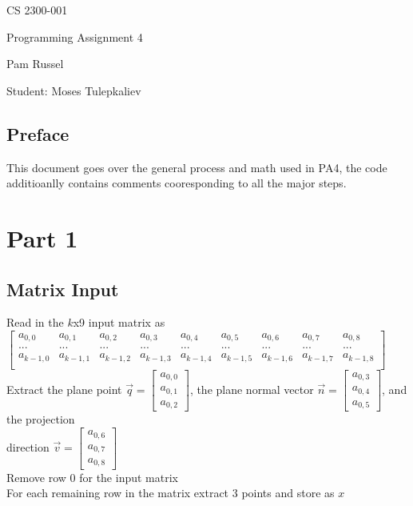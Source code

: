 \documentclass[11pt]{article}
\begin{document}
 

\rhead{\today}

\begin{center}\begin{Large}
CS 2300-001

Programming Assignment 4

Pam Russel

Student: Moses Tulepkaliev
\end{Large}
\end{center}

\subsection*{Preface}
This document goes over the general process and math used in PA4, the code additioanlly contains comments cooresponding to all the major steps.
\section*{Part 1}
\subsection*{Matrix Input}
 Read in the $k$x9 input matrix as $
	\begin{bmatrix}
	a_{0,0} & a_{0,1} &a_{0,2}&a_{0,3}&a_{0,4}&a_{0,5}&a_{0,6}&a_{0,7}&a_{0,8}\\
	...&...&...&...&...&...&...&...&...\\
	a_{k-1,0}&a_{k-1,1}&a_{k-1,2}&a_{k-1,3}& a_{k-1,4}&a_{k-1,5}&a_{k-1,6}&a_{k-1,7}&a_{k-1,8}\\
	\end{bmatrix}$\\
	Extract the plane point $\vec{q} = \begin{bmatrix} a_{0,0} \\a_{0,1} \\a_{0,2}\end{bmatrix}$,
	the plane normal vector $\vec{n} = \begin{bmatrix} a_{0,3} \\a_{0,4} \\a_{0,5}\end{bmatrix}$,
	and the projection \\direction  $\vec{v} = \begin{bmatrix} a_{0,6} \\a_{0,7} \\a_{0,8}\end{bmatrix}$\\
	Remove row 0 for the input matrix\\
	For each remaining row in the matrix extract 3 points and store as  $x$\\
\end{document}
